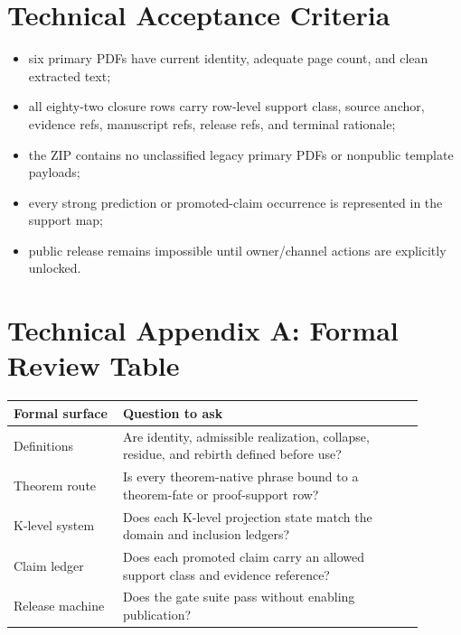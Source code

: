 \documentclass[11pt,a4paper]{article}
\begin{document}
\section*{Technical Acceptance Criteria}
\begin{itemize}
  \item six primary PDFs have current identity, adequate page count, and clean extracted text;
  \item all eighty-two closure rows carry row-level support class, source anchor, evidence refs, manuscript refs, release refs, and terminal rationale;
  \item the ZIP contains no unclassified legacy primary PDFs or nonpublic template payloads;
  \item every strong prediction or promoted-claim occurrence is represented in the support map;
  \item public release remains impossible until owner/channel actions are explicitly unlocked.
\end{itemize}

\clearpage
\section*{Technical Appendix A: Formal Review Table}
\begin{longtable}{>{\raggedright\arraybackslash}p{0.24\linewidth}>{\raggedright\arraybackslash}p{0.66\linewidth}}
\textbf{Formal surface} & \textbf{Question to ask}\\
\hline
Definitions & Are identity, admissible realization, collapse, residue, and rebirth defined before use?\\
Theorem route & Is every theorem-native phrase bound to a theorem-fate or proof-support row?\\
K-level system & Does each K-level projection state match the domain and inclusion ledgers?\\
Claim ledger & Does each promoted claim carry an allowed support class and evidence reference?\\
Release machine & Does the gate suite pass without enabling publication?\\
\end{longtable}

\clearpage
\end{document}
